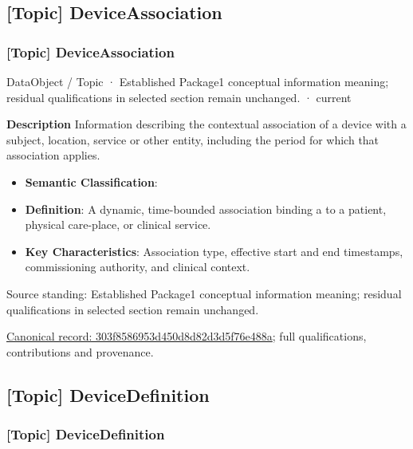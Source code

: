 \subsection{[Topic] DeviceAssociation}

\subsubsection{[Topic] DeviceAssociation}

\label{element:303f8586953d450d8d82d3d5f76e488a}
{\small DataObject / Topic · Established Package1 conceptual information meaning; residual qualifications in selected section remain unchanged. · current}\par

\textbf{Description}
Information describing the contextual association of a device with a subject, location, service or other entity, including the period for which that association applies.



\begin{itemize}


\item \textbf{Semantic Classification}: \texttt{}

\item \textbf{Definition}: A dynamic, time-bounded association binding a \texttt{} to a patient, physical care-place, or clinical service.

\item \textbf{Key Characteristics}: Association type, effective start and end timestamps, commissioning authority, and clinical context.

\end{itemize}


Source standing: Established Package1 conceptual information meaning; residual qualifications in selected section remain unchanged.


{\footnotesize \href{../../../../continuum/application/data-object/topic/303f8586953d450d8d82d3d5f76e488a.md}{Canonical record: 303f8586953d450d8d82d3d5f76e488a}; full qualifications, contributions and provenance.}\par
\subsection{[Topic] DeviceDefinition}

\subsubsection{[Topic] DeviceDefinition}

